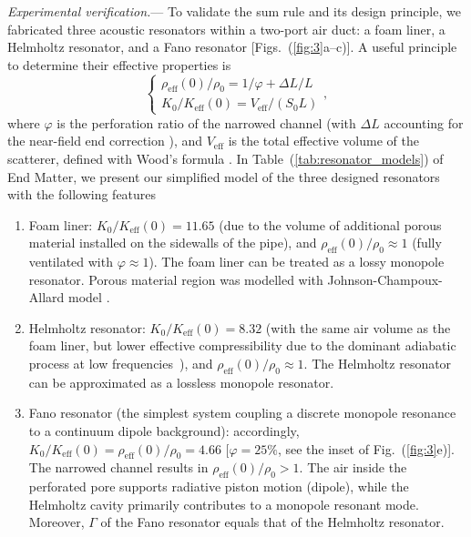 \documentclass[final,5p,times,twocolumn]{elsarticle}
\begin{document}
\textit{Experimental verification.}— To validate the sum rule and its design principle, we fabricated three acoustic resonators within a two-port air duct: a foam liner, a Helmholtz resonator, and a Fano resonator [Figs.~(\ref{fig:3}a–c)]. A useful principle \cite{qu2025duality} to determine their effective properties is
\begin{equation}\label{eq:eff}
	\left\{
	\begin{array}{l}
		{\rho_{\mathrm{eff}}(0)}/{\rho_0} = {1}/{\varphi} + {\Delta L}/{L}\\
		{K_0}/{K_{\mathrm{eff}}(0)} = {V_\mathrm{eff}}/{(S_0 L)}
	\end{array}
	\right.,
\end{equation}
where $\varphi$ is the perforation ratio of the narrowed channel (with $\Delta L$ accounting for the near-field end correction \cite{qu2024analytical}), and $V_\mathrm{eff}$ is the total effective volume of the scatterer, defined with Wood's formula \cite{milton2022theory,ge2025causal}. In Table~(\ref{tab:resonator_models}) of End Matter, we present our simplified model of the three designed resonators with the following features
\begin{enumerate}
	\item Foam liner: $K_0/K_\mathrm{eff}(0)= 11.65$ (due to the volume of additional porous material installed on the sidewalls of the pipe), and $\rho_\mathrm{eff}(0)/\rho_0 \approx 1$ (fully ventilated with $\varphi\approx1$). The foam liner can be treated as a lossy monopole resonator. Porous material region was modelled with Johnson-Champoux-Allard model \cite{yang2017sound}.
	\item Helmholtz resonator: $K_0/K_\mathrm{eff}(0)=8.32$ (with the same air volume as the foam liner, but lower effective compressibility due to the dominant adiabatic process at low frequencies~\cite{ge2025causal}), and $\rho_\mathrm{eff}(0)/\rho_0 \approx 1$. The Helmholtz resonator can be approximated as a lossless monopole resonator.
	\item Fano resonator (the simplest system coupling a discrete monopole resonance to a continuum dipole background): accordingly, $K_0/K_\mathrm{eff}(0)=\rho_\mathrm{eff}(0)/\rho_0 = 4.66$ [$\varphi=25\%$, see the inset of Fig.~(\ref{fig:3}e)]. The narrowed channel results in $\rho_\mathrm{eff}(0)/\rho_0>1$. The air inside the perforated pore supports radiative piston motion (dipole), while the Helmholtz cavity primarily contributes to a monopole resonant mode. Moreover, $\Gamma$ of the Fano resonator equals that of the Helmholtz resonator.
\end{enumerate}
\end{document}

